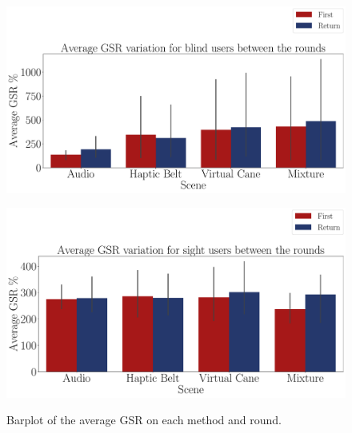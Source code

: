 \begin{figure}[!htb]
    \centering
    \begin{minipage}{\textwidth}
        \centering
        \includegraphics[width = \textwidth]{Resultados/GSR/Figuras/pdf/barplot_gsr_avg_4_scene_blind.pdf}
        \label{fig:barplot_gsr_avg_4_scene_blind}
    \end{minipage}
    \begin{minipage}{\textwidth}
        \centering
        \includegraphics[width = \textwidth]{Resultados/GSR/Figuras/pdf/barplot_gsr_avg_4_scene_sight.pdf}
        \label{fig:barplot_gsr_avg_4_scene_sight}
    \end{minipage}
    \caption{Barplot of the average GSR on each method and round.}
    \label{fig:barplot_gsr_avg_4_scene_blind_sight}
\end{figure}

